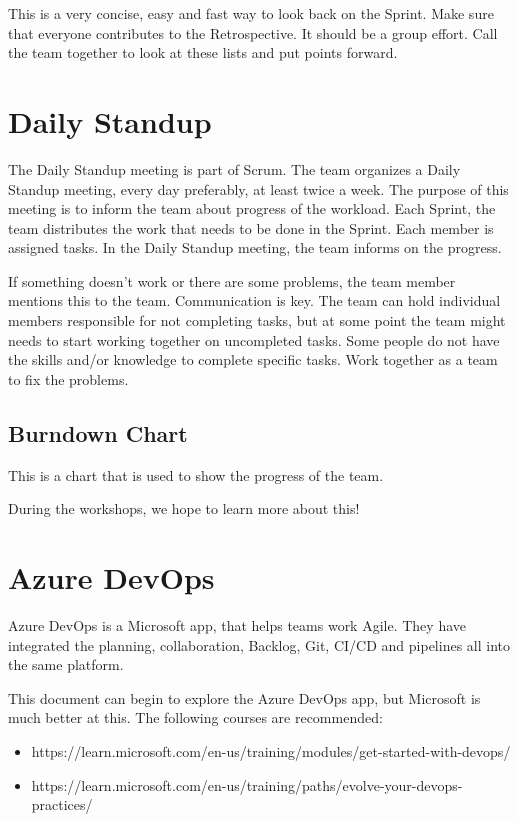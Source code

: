 \documentclass[10pt]{report}
\begin{document}
This is a very concise, easy and fast way to look back on the Sprint. Make sure that everyone contributes to the Retrospective. It should be a group effort. Call the team together to look at these lists and put points forward.

\newpage

\section{Daily Standup}

The Daily Standup meeting is part of Scrum. The team organizes a Daily Standup meeting, every day preferably, at least twice a week. The purpose of this meeting is to inform the team about progress of the workload. Each Sprint, the team distributes the work that needs to be done in the Sprint. Each member is assigned tasks. In the Daily Standup meeting, the team informs on the progress.

If something doesn't work or there are some problems, the team member mentions this to the team. Communication is key. The team can hold individual members responsible for not completing tasks, but at some point the team might needs to start working together on uncompleted tasks. Some people do not have the skills and/or knowledge to complete specific tasks. Work together as a team to fix the problems.

\subsection{Burndown Chart}

This is a chart that is used to show the progress of the team.

During the workshops, we hope to learn more about this!

\newpage

\section{Azure DevOps}

Azure DevOps is a Microsoft app, that helps teams work Agile. They have integrated the planning, collaboration, Backlog, Git, CI/CD and pipelines all into the same platform. 

This document can begin to explore the Azure DevOps app, but Microsoft is much better at this. The following courses are recommended:

\begin{itemize}
	\item https://learn.microsoft.com/en-us/training/modules/get-started-with-devops/
	\item https://learn.microsoft.com/en-us/training/paths/evolve-your-devops-practices/
\end{itemize}
\end{document}
